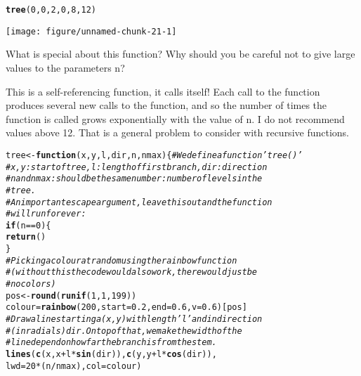 \documentclass[12pt,a4paper]{scrartcl}\usepackage[]{graphicx}\usepackage[]{color}
\makeatletter
\def\maxwidth{ %
  \ifdim\Gin@nat@width>\linewidth
    \linewidth
  \else
    \Gin@nat@width
  \fi
}
\newcommand{\hlnum}[1]{\textcolor[rgb]{0.686,0.059,0.569}{#1}}%
\newcommand{\hlcom}[1]{\textcolor[rgb]{0.678,0.584,0.686}{\textit{#1}}}%
\newcommand{\hlopt}[1]{\textcolor[rgb]{0,0,0}{#1}}%
\newcommand{\hlstd}[1]{\textcolor[rgb]{0.345,0.345,0.345}{#1}}%
\newcommand{\hlkwa}[1]{\textcolor[rgb]{0.161,0.373,0.58}{\textbf{#1}}}%
\newcommand{\hlkwb}[1]{\textcolor[rgb]{0.69,0.353,0.396}{#1}}%
\newcommand{\hlkwc}[1]{\textcolor[rgb]{0.333,0.667,0.333}{#1}}%
\newcommand{\hlkwd}[1]{\textcolor[rgb]{0.737,0.353,0.396}{\textbf{#1}}}%
\newenvironment{kframe}{%
 \def\at@end@of@kframe{}%
 \ifinner\ifhmode%
  \def\at@end@of@kframe{\end{minipage}}%
  \begin{minipage}{\columnwidth}%
 \fi\fi%
 \def\FrameCommand##1{\hskip\@totalleftmargin \hskip-\fboxsep
 \colorbox{shadecolor}{##1}\hskip-\fboxsep
     \hskip-\linewidth \hskip-\@totalleftmargin \hskip\columnwidth}%
 \MakeFramed {\advance\hsize-\width
   \@totalleftmargin\z@ \linewidth\hsize
   \@setminipage}}%
 {\par\unskip\endMakeFramed%
 \at@end@of@kframe}
\newenvironment{knitrout}{}{} %
\makeatother
\begin{document}
\begin{Exercise}[difficulty=2, title={What does this function do?}]
\begin{knitrout}
\begin{kframe}
\begin{alltt}
\hlkwd{tree}\hlstd{(}\hlnum{0}\hlstd{,}\hlnum{0}\hlstd{,}\hlnum{2}\hlstd{,}\hlnum{0}\hlstd{,}\hlnum{8}\hlstd{,}\hlnum{12}\hlstd{)}
\end{alltt}
\end{kframe}
\texttt{[image: figure/unnamed-chunk-21-1]} 

\end{knitrout}

What is special about this function? Why should you be careful not to give large values to the parameters n? 
\end{Exercise}
\begin{Answer}
This is a self-referencing function, it calls itself! Each call to the function produces several new calls to the function, and so the number of times the function is called grows exponentially with the value of n. I do not recommend values above 12. That is a general problem to consider with recursive functions. 
\begin{knitrout}
\color{fgcolor}\begin{kframe}
\begin{alltt}
\hlstd{tree}\hlkwb{<-}\hlkwa{function}\hlstd{(}\hlkwc{x}\hlstd{,}\hlkwc{y}\hlstd{,}\hlkwc{l}\hlstd{,}\hlkwc{dir}\hlstd{,}\hlkwc{n}\hlstd{,}\hlkwc{nmax}\hlstd{)\{} \hlcom{# We define a function 'tree()'}
\hlcom{# x,y: start of tree, l: length of first branch, dir: direction}
\hlcom{# n and nmax: should be the same number: number of levels in the}
\hlcom{# tree.}
\hlcom{# An important escape argument, leave this out and the function}
\hlcom{# will run forever:}
\hlkwa{if}\hlstd{(n}\hlopt{==}\hlnum{0}\hlstd{)\{}
\hlkwd{return}\hlstd{()}
\hlstd{\}}
\hlcom{# Picking a colour at random using the rainbow function}
\hlcom{# (without this the code would also work, there would just be}
\hlcom{# no colors)}
\hlstd{pos}\hlkwb{<-}\hlkwd{round}\hlstd{(}\hlkwd{runif}\hlstd{(}\hlnum{1}\hlstd{,}\hlnum{1}\hlstd{,}\hlnum{199}\hlstd{))}
\hlstd{colour}\hlkwb{=}\hlkwd{rainbow}\hlstd{(}\hlnum{200}\hlstd{,}\hlkwc{start}\hlstd{=}\hlnum{0.2}\hlstd{,}\hlkwc{end}\hlstd{=}\hlnum{0.6}\hlstd{,}\hlkwc{v}\hlstd{=}\hlnum{0.6}\hlstd{)[pos]}
\hlcom{# Draw a line starting a (x,y) with length 'l' and in direction}
\hlcom{# (in radials) dir. On top of that, we make the width of the}
\hlcom{# line depend on how far the branch is from the stem.}
\hlkwd{lines}\hlstd{(}\hlkwd{c}\hlstd{(x,x}\hlopt{+}\hlstd{l}\hlopt{*}\hlkwd{sin}\hlstd{(dir)),}\hlkwd{c}\hlstd{(y,y}\hlopt{+}\hlstd{l}\hlopt{*}\hlkwd{cos}\hlstd{(dir)),}
      \hlkwc{lwd}\hlstd{=}\hlnum{20}\hlopt{*}\hlstd{(n}\hlopt{/}\hlstd{nmax),}\hlkwc{col}\hlstd{=colour)}

\end{alltt}
\end{kframe}
\end{knitrout}
\end{Answer}
\end{document}
